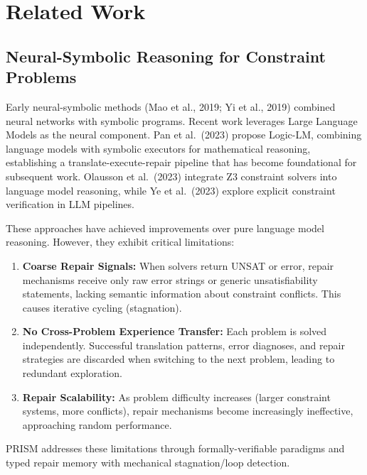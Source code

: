 
\section{Related Work}

\subsection{Neural-Symbolic Reasoning for Constraint Problems}

Early neural-symbolic methods (Mao et al., 2019; Yi et al., 2019) combined neural networks with symbolic programs. Recent work leverages Large Language Models as the neural component. Pan et al.~(2023) propose Logic-LM, combining language models with symbolic executors for mathematical reasoning, establishing a translate-execute-repair pipeline that has become foundational for subsequent work. Olausson et al.~(2023) integrate Z3 constraint solvers into language model reasoning, while Ye et al.~(2023) explore explicit constraint verification in LLM pipelines.

These approaches have achieved improvements over pure language model reasoning. However, they exhibit critical limitations:

\begin{enumerate}
    \item \textbf{Coarse Repair Signals:} When solvers return UNSAT or error, repair mechanisms receive only raw error strings or generic unsatisfiability statements, lacking semantic information about constraint conflicts. This causes iterative cycling (stagnation).

    \item \textbf{No Cross-Problem Experience Transfer:} Each problem is solved independently. Successful translation patterns, error diagnoses, and repair strategies are discarded when switching to the next problem, leading to redundant exploration.

    \item \textbf{Repair Scalability:} As problem difficulty increases (larger constraint systems, more conflicts), repair mechanisms become increasingly ineffective, approaching random performance.
\end{enumerate}

PRISM addresses these limitations through formally-verifiable paradigms and typed repair memory with mechanical stagnation/loop detection.

